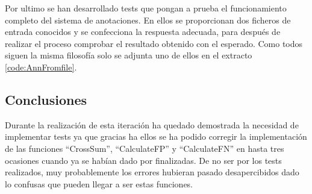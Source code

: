     Por ultimo se han desarrollado tests que pongan a prueba el funcionamiento completo del sistema de anotaciones. En ellos se proporcionan dos ficheros de entrada conocidos y se confecciona la respuesta adecuada, para después de realizar el proceso comprobar el resultado obtenido con el esperado. Como todos siguen la misma filosofía solo se adjunta uno de ellos en el extracto \ref{code:AnnFromfile}.
    
    
    \subsection{Conclusiones}
    
    Durante la realización de esta iteración ha quedado demostrada la necesidad de implementar tests ya que gracias ha ellos se ha podido corregir la implementación de las funciones ``CrossSum'', ``CalculateFP'' y ``CalculateFN'' en hasta tres ocasiones cuando ya se habían dado por finalizadas. De no ser por los tests realizados, muy probablemente los errores hubieran pasado desapercibidos dado lo confusas que pueden llegar a ser estas funciones.